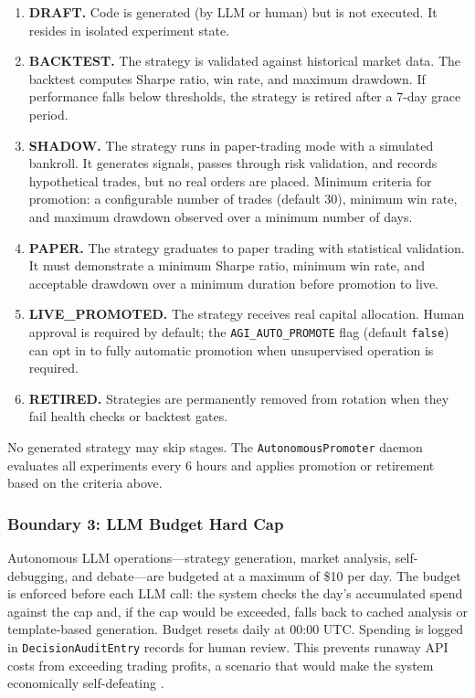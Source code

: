 \begin{enumerate}
    \item \textbf{DRAFT.} Code is generated (by LLM or human) but is not executed. It resides in isolated experiment state.
    \item \textbf{BACKTEST.} The strategy is validated against historical market data. The backtest computes Sharpe ratio, win rate, and maximum drawdown. If performance falls below thresholds, the strategy is retired after a 7-day grace period.
    \item \textbf{SHADOW.} The strategy runs in paper-trading mode with a simulated bankroll. It generates signals, passes through risk validation, and records hypothetical trades, but no real orders are placed. Minimum criteria for promotion: a configurable number of trades (default 30), minimum win rate, and maximum drawdown observed over a minimum number of days.
    \item \textbf{PAPER.} The strategy graduates to paper trading with statistical validation. It must demonstrate a minimum Sharpe ratio, minimum win rate, and acceptable drawdown over a minimum duration before promotion to live.
    \item \textbf{LIVE\_PROMOTED.} The strategy receives real capital allocation. Human approval is required by default; the \texttt{AGI\_AUTO\_PROMOTE} flag (default \texttt{false}) can opt in to fully automatic promotion when unsupervised operation is required.
    \item \textbf{RETIRED.} Strategies are permanently removed from rotation when they fail health checks or backtest gates.
\end{enumerate}

No generated strategy may skip stages. The \texttt{AutonomousPromoter} daemon evaluates all experiments every 6 hours and applies promotion or retirement based on the criteria above.

\subsubsection{Boundary 3: LLM Budget Hard Cap}

Autonomous LLM operations---strategy generation, market analysis, self-debugging, and debate---are budgeted at a maximum of \$10 per day. The budget is enforced before each LLM call: the system checks the day's accumulated spend against the cap and, if the cap would be exceeded, falls back to cached analysis or template-based generation. Budget resets daily at 00:00 UTC. Spending is logged in \texttt{DecisionAuditEntry} records for human review. This prevents runaway API costs from exceeding trading profits, a scenario that would make the system economically self-defeating \citep{irving2018ai}.

